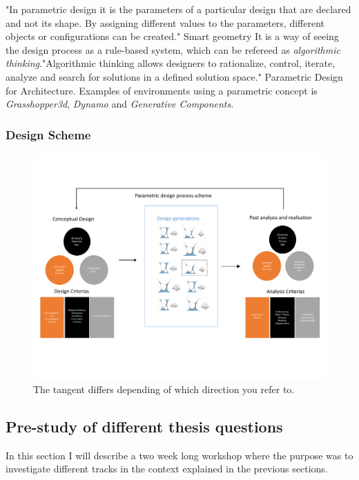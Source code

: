 "In parametric design it is the parameters of a particular design that are declared and not its shape. By assigning different values to the parameters, different objects or configurations can be created." Smart geometry
It is a way of seeing the design process as a rule-based system, which can be refereed as \textit{algorithmic thinking}."Algorithmic thinking allows designers  to rationalize, control, iterate, analyze and search for solutions in a defined solution space." Parametric Design for Architecture.
Examples of environments using a parametric concept is \textit{Grasshopper3d}, \textit{Dynamo} and 
\textit{Generative Components}.

\subsubsection{Design Scheme} \label{dScheme}

\begin{figure}[H]
\centering
\includegraphics[width=1.0\linewidth ]{figure/Introduction/DesignScheme.pdf}
\caption{The tangent differs depending of which direction you refer to. }
\end{figure}

\subsection{Pre-study of different thesis questions}
In this section I will describe a two week long workshop where the purpose was to investigate different tracks in the context explained in the previous sections. 

